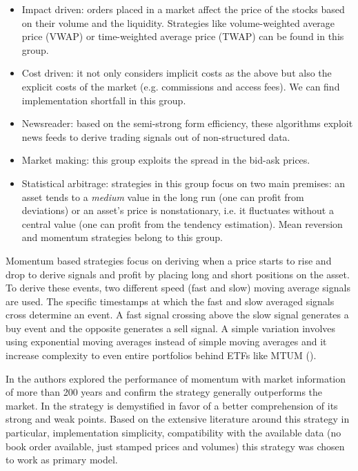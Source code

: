 \begin{itemize}
    \item Impact driven: orders placed in a market affect the price of the stocks based on their volume and the liquidity. Strategies like volume-weighted average price (VWAP) or time-weighted average price (TWAP) can be found in this group.
    \item Cost driven: it not only considers implicit costs as the above but also the explicit costs of the market (e.g. commissions and access fees). We can find implementation shortfall in this group.
    \item Newsreader: based on the semi-strong form efficiency, these algorithms exploit news feeds to derive trading signals out of non-structured data.
    \item Market making: this group exploits the spread in the bid-ask prices.
    \item Statistical arbitrage: strategies in this group focus on two main premises: an asset tends to a \emph{medium} value in the long run (one can profit from deviations) or an asset's price is nonstationary, i.e. it fluctuates without a central value (one can profit from the tendency estimation). Mean reversion and momentum strategies belong to this group.
\end{itemize}

Momentum based strategies focus on deriving when a price starts to rise and drop to derive signals and profit by placing long and short positions on the asset. To derive these events, two different speed (fast and slow) moving average signals are used. The specific timestamps at which the fast and slow averaged signals cross determine an event. A fast signal crossing above the slow signal generates a buy event and the opposite generates a sell signal. A simple variation involves using exponential moving averages instead of simple moving averages and it increase complexity to even entire portfolios behind ETFs like MTUM (\cite{mtum_etf}).

In \cite{value_momentum} the authors explored the performance of momentum with market information of more than 200 years and confirm the strategy generally outperforms the market. In \cite{fact_fiction_momentum} the strategy is demystified in favor of a better comprehension of its strong and weak points. Based on the extensive literature around this strategy in particular, implementation simplicity, compatibility with the available data (no book order available, just stamped prices and volumes) this strategy was chosen to work as primary model.


